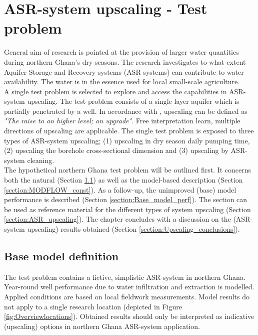 \chapter{ASR-system upscaling - Test problem}
\label{chapter:model_scenarios}
General aim of research is pointed at the provision of larger water quantities during northern Ghana's dry seasons. The research investigates to what extent Aquifer Storage and Recovery systems (ASR-systems) can contribute to water availability. The water is in the essence used for local small-scale agriculture. \\

A single test problem is selected to explore and access the capabilities in ASR-system upscaling. The test problem consists of a single layer aquifer which is partially penetrated by a well. In accordance with \citet{HoughtonMifflin2016}, upscaling can be defined as \emph{"The raise to an higher level; an upgrade"}. Free interpretation learn, multiple directions of upscaling are applicable. The single test problem is exposed to three types of ASR-system upscaling; (1) upscaling in dry season daily pumping time, (2) upscaling the borehole cross-sectional dimension and (3) upscaling by ASR-system cleaning. \\

The hypothetical northern Ghana test problem will be outlined first. It concerns both the natural (Section \ref{section:test_problem_def}) as well as the model-based description (Section \ref{section:MODFLOW_const}). As a follow-up, the unimproved (base) model performance is described (Section \ref{section:Base_model_perf}). The section can be used as reference material for the different types of system upscaling (Section \ref{section:ASR_upscaling}). The chapter concludes with a discussion on the (ASR-system upscaling) results obtained (Section \ref{section:Upscaling_conclusions}). 

\section{Base model definition}
\label{section:test_problem_def}
The test problem contains a fictive, simplistic ASR-system in northern Ghana. Year-round well performance due to water infiltration and extraction is modelled. Applied conditions are based on local fieldwork measurements. Model results do not apply to a single research location (depicted in Figure \ref{fig:Overviewlocations}). Obtained results should only be interpreted as indicative (upscaling) options in northern Ghana ASR-system application.

